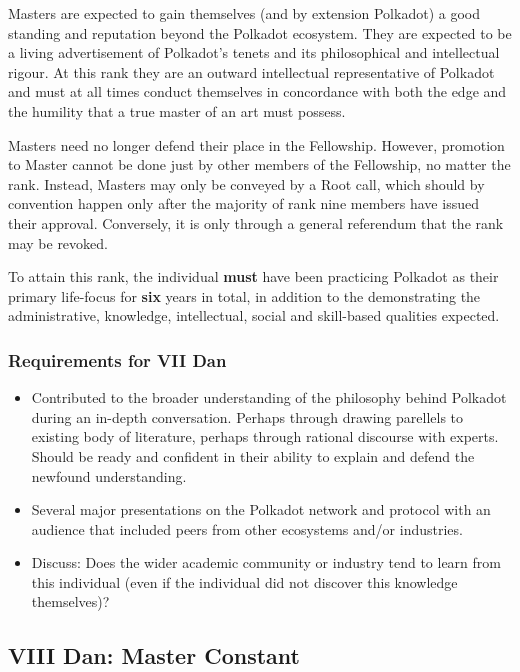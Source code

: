 \documentclass[9pt,oneside]{amsart}
\begin{document}
Masters are expected to gain themselves (and by extension Polkadot) a good standing and reputation beyond the Polkadot ecosystem. They are expected to be a living advertisement of Polkadot's tenets and its philosophical and intellectual rigour. At this rank they are an outward intellectual representative of Polkadot and must at all times conduct themselves in concordance with both the edge and the humility that a true master of an art must possess.

Masters need no longer defend their place in the Fellowship. However, promotion to Master cannot be done just by other members of the Fellowship, no matter the rank. Instead, Masters may only be conveyed by a Root call, which should by convention happen only after the majority of rank nine members have issued their approval. Conversely, it is only through a general referendum that the rank may be revoked.

To attain this rank, the individual \textbf{must} have been practicing Polkadot as their primary life-focus for \textbf{six} years in total, in addition to the demonstrating the administrative, knowledge, intellectual, social and skill-based qualities expected.

\subsubsection{Requirements for VII Dan}\label{requirements-7}

\begin{itemize}
\item Contributed to the broader understanding of the philosophy behind Polkadot during an in-depth conversation. Perhaps through drawing parellels to existing body of literature, perhaps through rational discourse with experts. Should be ready and confident in their ability to explain and defend the newfound understanding.
\item Several major presentations on the Polkadot network and protocol with an audience that included peers from other ecosystems and/or industries.
\item Discuss: Does the wider academic community or industry tend to learn from this individual (even if the individual did not discover this knowledge themselves)?
\end{itemize}

\subsection{VIII Dan: Master Constant}\label{viii-dan-master-constant}~\\
\end{document}
